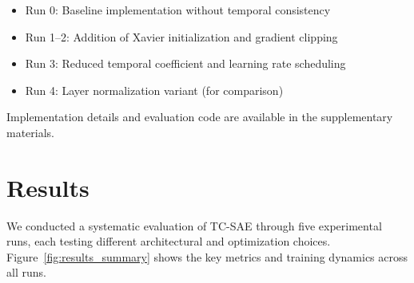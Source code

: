 \documentclass{article} %
\begin{document}
\begin{itemize}
    \item Run 0: Baseline implementation without temporal consistency
    \item Run 1--2: Addition of Xavier initialization and gradient clipping
    \item Run 3: Reduced temporal coefficient and learning rate scheduling
    \item Run 4: Layer normalization variant (for comparison)
\end{itemize}

Implementation details and evaluation code are available in the supplementary materials.

\section{Results}
\label{sec:results}

We conducted a systematic evaluation of TC-SAE through five experimental runs, each testing different architectural and optimization choices. Figure~\ref{fig:results_summary} shows the key metrics and training dynamics across all runs.
\end{document}
